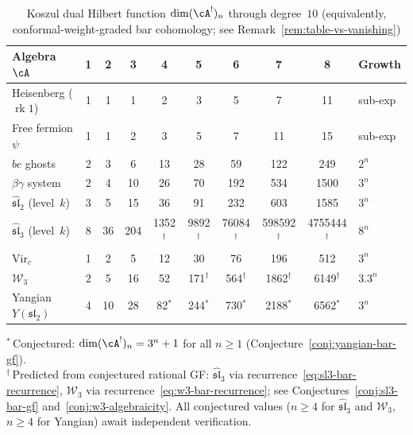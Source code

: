 \begin{table}[ht]
\centering
\caption{Koszul dual Hilbert function $\dim (\cA^!)_n$ through degree~$10$
(equivalently, conformal-weight-graded bar cohomology;
see Remark~\ref{rem:table-vs-vanishing})}
\label{tab:bar-dimensions}
\renewcommand{\arraystretch}{1.4}
{\scriptsize
\begin{tabular}{|l|c|c|c|c|c|c|c|c|l|}
\hline
\textbf{Algebra $\cA$}
  & \textbf{1} & \textbf{2} & \textbf{3}
  & \textbf{4} & \textbf{5} & \textbf{6}
  & \textbf{7} & \textbf{8}
  & \textbf{Growth} \\
\hline
Heisenberg ($\operatorname{rk}1$)
  & 1 & 1 & 1 & 2 & 3 & 5 & 7 & 11 & sub-exp \\
\hline
Free fermion $\psi$
  & 1 & 1 & 2 & 3 & 5 & 7 & 11 & 15 & sub-exp \\
\hline
$bc$ ghosts
  & 2 & 3 & 6 & 13 & 28 & 59 & 122 & 249 & $2^n$ \\
\hline
$\beta\gamma$ system
  & 2 & 4 & 10 & 26 & 70 & 192 & 534 & 1500 & $3^n$ \\
\hline
$\widehat{\mathfrak{sl}}_2$ (level~$k$)
  & 3 & 5 & 15 & 36 & 91 & 232 & 603 & 1585 & $3^n$ \\
\hline
$\widehat{\mathfrak{sl}}_3$ (level~$k$)
  & 8 & 36 & 204 & 1352$^\dagger$ & 9892$^\dagger$ & 76084$^\dagger$ & 598592$^\dagger$ & 4755444$^\dagger$ & $8^n$ \\
\hline
$\mathrm{Vir}_c$
  & 1 & 2 & 5 & 12 & 30 & 76 & 196 & 512 & $3^n$ \\
\hline
$\mathcal{W}_3$
  & 2 & 5 & 16 & 52 & 171$^\dagger$ & 564$^\dagger$ & 1862$^\dagger$ & 6149$^\dagger$ & $3.3^n$ \\
\hline
Yangian $Y(\mathfrak{sl}_2)$
  & 4 & 10 & 28 & 82$^*$ & 244$^*$ & 730$^*$ & 2188$^*$ & 6562$^*$ & $3^n$ \\
\hline
\end{tabular}
}

\medskip
\noindent
{\footnotesize $^*$\,Conjectured: $\dim (\cA^!)_n = 3^n + 1$
for all $n \geq 1$
(Conjecture~\ref{conj:yangian-bar-gf}).\\
$^\dagger$\,Predicted from conjectured rational GF\@:
$\widehat{\mathfrak{sl}}_3$ via recurrence~\eqref{eq:sl3-bar-recurrence},
$\mathcal{W}_3$ via recurrence~\eqref{eq:w3-bar-recurrence};
see Conjectures~\ref{conj:sl3-bar-gf}
and~\ref{conj:w3-algebraicity}.
All conjectured values ($n \geq 4$ for
$\widehat{\mathfrak{sl}}_3$ and $\mathcal{W}_3$,
$n \geq 4$ for Yangian) await independent verification.}
\end{table}

